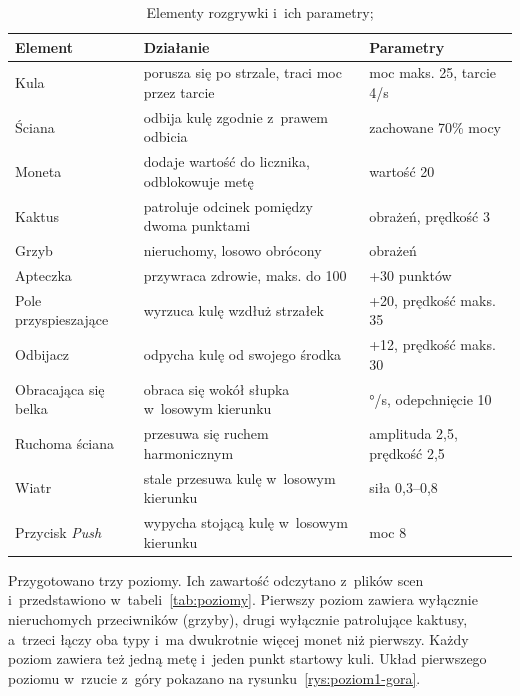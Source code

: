 \begin{table}[!htb]
  \centering
  \caption{Elementy rozgrywki i~ich parametry; \zrodloWlasne}
  \label{tab:elementy}
  \begin{tabularx}{\textwidth}{>{\raggedright\arraybackslash}p{3.3cm} X >{\raggedright\arraybackslash}p{3.6cm}}
    \toprule
    \textbf{Element} & \textbf{Działanie} & \textbf{Parametry} \\
    \midrule
    Kula & porusza się po strzale, traci moc przez tarcie & moc maks. 25, tarcie 4/s \\
    Ściana & odbija kulę zgodnie z~prawem odbicia & zachowane 70\% mocy \\
    Moneta & dodaje wartość do licznika, odblokowuje metę & wartość 20 \\
    Kaktus & patroluje odcinek pomiędzy dwoma punktami & 29 obrażeń, prędkość 3 \\
    Grzyb & nieruchomy, losowo obrócony & 17 obrażeń \\
    Apteczka & przywraca zdrowie, maks. do 100 & +30 punktów \\
    Pole przyspieszające & wyrzuca kulę wzdłuż strzałek & +20, prędkość maks. 35 \\
    Odbijacz & odpycha kulę od swojego środka & +12, prędkość maks. 30 \\
    Obracająca się belka & obraca się wokół słupka w~losowym kierunku & 90°/s, odepchnięcie 10 \\
    Ruchoma ściana & przesuwa się ruchem harmonicznym & amplituda 2,5, prędkość 2,5 \\
    Wiatr & stale przesuwa kulę w~losowym kierunku & siła 0,3--0,8 \\
    Przycisk \emph{Push} & wypycha stojącą kulę w~losowym kierunku & moc 8 \\
    \bottomrule
  \end{tabularx}
\end{table}

Przygotowano trzy poziomy. Ich zawartość odczytano z~plików scen i~przedstawiono
w~tabeli~\ref{tab:poziomy}. Pierwszy poziom zawiera wyłącznie nieruchomych przeciwników
(grzyby), drugi wyłącznie patrolujące kaktusy, a~trzeci łączy oba typy i~ma dwukrotnie
więcej monet niż pierwszy. Każdy poziom zawiera też jedną metę i~jeden punkt startowy kuli.
Układ pierwszego poziomu w~rzucie z~góry pokazano na rysunku~\ref{rys:poziom1-gora}.

